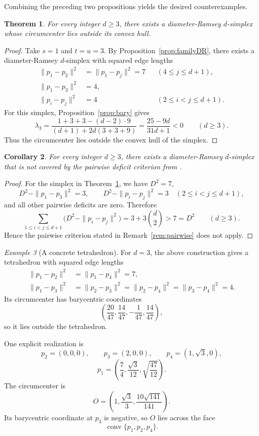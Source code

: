 \documentclass[preprint,12pt]{elsarticle}
\newtheorem{theorem}{Theorem}[section]
\newtheorem{corollary}[theorem]{Corollary}
\theoremstyle{remark}
\newtheorem{example}[theorem]{Example}
\DeclareMathOperator{\conv}{conv}
\begin{document}
Combining the preceding two propositions yields the desired counterexamples.

\begin{theorem}\label{thm:main}
For every integer $d\ge 3$, there exists a diameter-Ramsey $d$-simplex whose circumcenter lies outside its convex hull.
\end{theorem}

\begin{proof}
Take $s=1$ and $t=u=3$. By Proposition~\ref{prop:familyDR}, there exists a diameter-Ramsey $d$-simplex with squared edge lengths
\[
\begin{aligned}
\|p_1-p_2\|^2&=\|p_1-p_j\|^2=7 && (4\le j\le d+1),\\
\|p_1-p_3\|^2&=4,\\
\|p_i-p_j\|^2&=4 && (2\le i<j\le d+1).
\end{aligned}
\]
For this simplex, Proposition~\ref{prop:bary} gives
\[
\lambda_3=
\frac{1+3+3-(d-2)\cdot 9}{(d+1)+2d(3+3+9)}
=\frac{25-9d}{31d+1}<0
\qquad (d\ge 3).
\]
Thus the circumcenter lies outside the convex hull of the simplex.
\end{proof}

\begin{corollary}\label{cor:strict}
For every integer $d\ge 3$, there exists a diameter-Ramsey $d$-simplex that is not covered by the pairwise deficit criterion from \cite[Section~4]{FPRR}.
\end{corollary}

\begin{proof}
For the simplex in Theorem~\ref{thm:main}, we have $D^2=7$,
\[
D^2-\|p_1-p_3\|^2=3,
\qquad
D^2-\|p_i-p_j\|^2=3
\quad (2\le i<j\le d+1),
\]
and all other pairwise deficits are zero. Therefore
\[
\sum_{1\le i<j\le d+1}\bigl(D^2-\|p_i-p_j\|^2\bigr)
=3+3\binom d2
>7=D^2
\qquad (d\ge 3).
\]
Hence the pairwise criterion stated in Remark~\ref{rem:pairwise} does not apply.
\end{proof}

\begin{example}[A concrete tetrahedron]\label{ex:tetra}
For $d=3$, the above construction gives a tetrahedron with squared edge lengths
\[
\begin{aligned}
\|p_1-p_2\|^2&=\|p_1-p_4\|^2=7,\\
\|p_1-p_3\|^2&=\|p_2-p_3\|^2=\|p_2-p_4\|^2=\|p_3-p_4\|^2=4.
\end{aligned}
\]
Its circumcenter has barycentric coordinates
\[
\left(\frac{20}{47},\frac{14}{47},-\frac{1}{47},\frac{14}{47}\right),
\]
so it lies outside the tetrahedron.

One explicit realization is
\[
p_2=(0,0,0),
\qquad
p_3=(2,0,0),
\qquad
p_4=(1,\sqrt{3},0),
\]
\[
p_1=\left(\frac{7}{4},\frac{\sqrt{3}}{12},\sqrt{\frac{47}{12}}\right).
\]
The circumcenter is
\[
O=\left(1,\frac{\sqrt{3}}{3},\frac{10\sqrt{141}}{141}\right).
\]
Its barycentric coordinate at $p_3$ is negative, so $O$ lies across the face
\[
\conv\{p_1,p_2,p_4\}.
\]
\end{example}
\end{document}
